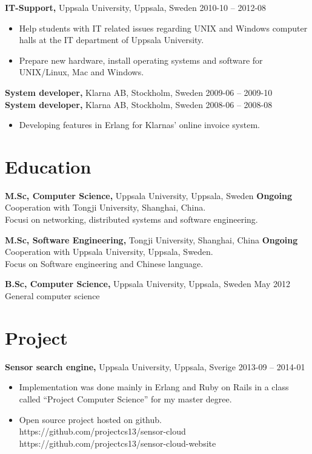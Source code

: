 \documentclass[margin]{res}
\begin{document}
\begin{resume}
{\bf IT-Support,} Uppsala University, Uppsala, Sweden \hfill 2010-10 -- 2012-08
 \begin{itemize} \itemsep -2pt  %
 \item Help students with IT related issues regarding UNIX and Windows
   computer halls at the IT department of Uppsala University.
 \item Prepare new hardware, install operating systems and software for UNIX/Linux, Mac and Windows.
 \end{itemize}

{\bf System developer,} Klarna AB, Stockholm, Sweden \hfill 2009-06 -- 2009-10\\
{\bf System developer,} Klarna AB, Stockholm, Sweden \hfill 2008-06 -- 2008-08
 \begin{itemize} \itemsep -2pt  %
 \item Developing features in Erlang for Klarnas' online invoice system.
 \end{itemize}

\section{Education}
{\bf M.Sc,  Computer Science,} Uppsala University, Uppsala, Sweden \hfill \textbf{Ongoing} \\
Cooperation with Tongji University, Shanghai, China. \\
Focusi on networking, distributed systems and software engineering.

{\bf M.Sc, Software Engineering,} Tongji University, Shanghai, China \hfill \textbf{Ongoing} \\
Cooperation with Uppsala University, Uppsala, Sweden.\\
Focus on Software engineering and Chinese language.

{\bf B.Sc, Computer Science,} Uppsala University, Uppsala, Sweden \hfill May 2012 \\
General computer science

\newpage
\section{Project}
{\bf Sensor search engine,} Uppsala University, Uppsala, Sverige \hfill 2013-09 -- 2014-01
 \begin{itemize} \itemsep -2pt  %
 \item Implementation was done mainly in Erlang and Ruby on Rails in
   a class called ``Project Computer Science'' for my master degree.
 \item Open source project hosted on github. \\
 https://github.com/projectcs13/sensor-cloud\\
 https://github.com/projectcs13/sensor-cloud-website
 \end{itemize}


\end{resume}
\end{document}
